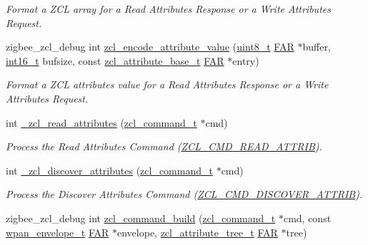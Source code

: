 \begin{DoxyCompactItemize}
\begin{DoxyCompactList}\small\item\em Format a Z\+CL array for a Read Attributes Response or a Write Attributes Request. \end{DoxyCompactList}\item 
zigbee\+\_\+zcl\+\_\+debug int \hyperlink{group__zcl_gae3f7f58d3b08caf95aa11f90e3995397}{zcl\+\_\+encode\+\_\+attribute\+\_\+value} (\hyperlink{group__hal__dos_gae1affc9ca37cfb624959c866a73f83c2}{uint8\+\_\+t} \hyperlink{group__hal_gaef060b3456fdcc093a7210a762d5f2ed}{F\+AR} $\ast$buffer, \hyperlink{group__hal__dos_ga2140805d08462d474b82ddc8d1c2f3e6}{int16\+\_\+t} bufsize, const \hyperlink{structzcl__attribute__base__t}{zcl\+\_\+attribute\+\_\+base\+\_\+t} \hyperlink{group__hal_gaef060b3456fdcc093a7210a762d5f2ed}{F\+AR} $\ast$entry)
\begin{DoxyCompactList}\small\item\em Format a Z\+CL attribute\textquotesingle{}s value for a Read Attributes Response or a Write Attributes Request. \end{DoxyCompactList}\item 
int \hyperlink{group__zcl_gaa34c917bf05a57503e63553efcb77dc9}{\+\_\+zcl\+\_\+read\+\_\+attributes} (\hyperlink{structzcl__command__t}{zcl\+\_\+command\+\_\+t} $\ast$cmd)
\begin{DoxyCompactList}\small\item\em Process the Read Attributes Command (\hyperlink{group__zcl_ga7a3d858b466e4202c6f2148a1b6a3eb2}{Z\+C\+L\+\_\+\+C\+M\+D\+\_\+\+R\+E\+A\+D\+\_\+\+A\+T\+T\+R\+IB}). \end{DoxyCompactList}\item 
int \hyperlink{group__zcl_ga385c41594437cdf661bfb518f11ee0fc}{\+\_\+zcl\+\_\+discover\+\_\+attributes} (\hyperlink{structzcl__command__t}{zcl\+\_\+command\+\_\+t} $\ast$cmd)
\begin{DoxyCompactList}\small\item\em Process the Discover Attributes Command (\hyperlink{group__zcl_ga2919d6fc8068efac4c9969938a4b9ff5}{Z\+C\+L\+\_\+\+C\+M\+D\+\_\+\+D\+I\+S\+C\+O\+V\+E\+R\+\_\+\+A\+T\+T\+R\+IB}). \end{DoxyCompactList}\item 
zigbee\+\_\+zcl\+\_\+debug int \hyperlink{group__zcl_gadeb35ab493fffec9ba1c33f658929136}{zcl\+\_\+command\+\_\+build} (\hyperlink{structzcl__command__t}{zcl\+\_\+command\+\_\+t} $\ast$cmd, const \hyperlink{structwpan__envelope__t}{wpan\+\_\+envelope\+\_\+t} \hyperlink{group__hal_gaef060b3456fdcc093a7210a762d5f2ed}{F\+AR} $\ast$envelope, \hyperlink{structzcl__attribute__tree__t}{zcl\+\_\+attribute\+\_\+tree\+\_\+t} \hyperlink{group__hal_gaef060b3456fdcc093a7210a762d5f2ed}{F\+AR} $\ast$tree)

\end{DoxyCompactItemize}
